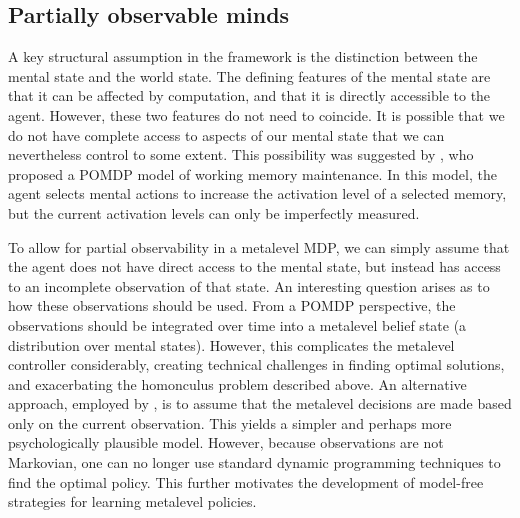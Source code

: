 \subsection{Partially observable minds}


A key structural assumption in the framework is the distinction between the mental state and the world state. The defining features of the mental state are that it can be affected by computation, and that it is directly accessible to the agent. However, these two features do not need to coincide. It is possible that we do not have complete access to aspects of our mental state that we can nevertheless control to some extent. This possibility was suggested by \citet{suchow2016deciding}, who proposed a POMDP model of working memory maintenance. In this model, the agent selects mental actions to increase the activation level of a selected memory, but the current activation levels can only be imperfectly measured.

To allow for partial observability in a metalevel MDP, we can simply assume that the agent does not have direct access to the mental state, but instead has access to an incomplete observation of that state. An interesting question arises as to how these observations should be used. From a POMDP perspective, the observations should be integrated over time into a metalevel belief state (a distribution over mental states). However, this complicates the metalevel controller considerably, creating technical challenges in finding optimal solutions, and exacerbating the homonculus problem described above. An alternative approach, employed by \citet{suchow2016deciding}, is to assume that the metalevel decisions are made based only on the current observation. This yields a simpler and perhaps more psychologically plausible model. However, because observations are not Markovian, one can no longer use standard dynamic programming techniques to find the optimal policy. This further motivates the development of model-free strategies for learning metalevel policies.

